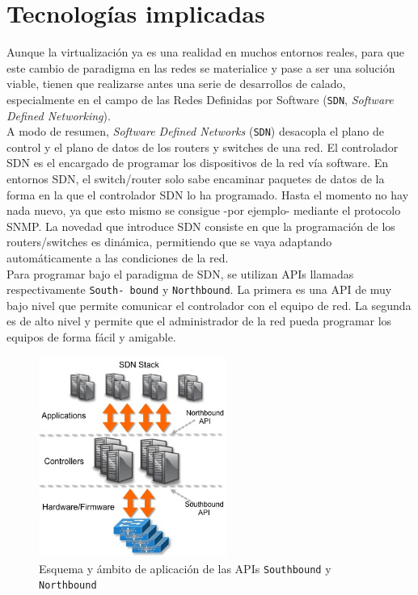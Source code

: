 \documentclass[a4paper, oneside, 12pt]{book}
\begin{document}
	\pagebreak
	
	\section{Tecnologías implicadas}
	\noindent Aunque la virtualización ya es una realidad en muchos entornos reales, para que este cambio de paradigma en las redes se materialice y pase a ser una solución viable, tienen que realizarse antes una serie de desarrollos de calado, especialmente en el campo de las Redes Definidas por Software (\texttt{SDN}, \textit{Software Defined Networking}). \\
	
	\noindent A modo de resumen, \textit{Software Defined Networks} (\texttt{SDN}) desacopla el plano de control y el plano de datos de los routers y switches de una red. El controlador SDN es el encargado de programar los dispositivos de la red vía software. En entornos SDN, el switch/router solo sabe encaminar paquetes de datos de la forma en la que el controlador SDN lo ha programado. Hasta el momento no hay nada nuevo, ya que esto mismo se consigue -por ejemplo- mediante el protocolo SNMP. La novedad que introduce SDN consiste en que la programación de los routers/switches es dinámica, permitiendo que se vaya adaptando automáticamente a las condiciones de la red. \\
	
	\noindent Para programar bajo el paradigma de SDN, se utilizan APIs llamadas respectivamente \texttt{South-
		bound} y \texttt{Northbound}. La primera es una API de muy bajo nivel que permite comunicar el controlador con el equipo de red. La segunda es de alto nivel y permite que el administrador de la red pueda programar los equipos de forma fácil y amigable.

	\vspace{20px}

	\begin{figure}[h!]
		\begin{center}
			\includegraphics[width=0.55\textwidth]{img/south_north.jpg}
			\caption{Esquema y ámbito de aplicación de las APIs \texttt{Southbound} y \texttt{Northbound}}
			\label{img: sdn + nfv}
		\end{center}
	\end{figure}
\end{document}

